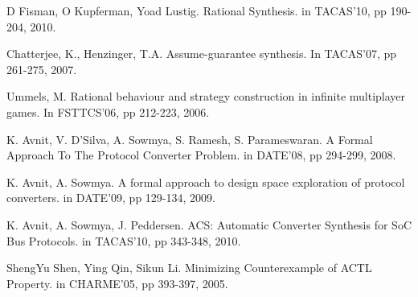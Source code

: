 \documentclass[journal]{IEEEtran}
\begin{document}
\begin{thebibliography}{1}
D Fisman, O Kupferman, Yoad Lustig.
Rational Synthesis.
in TACAS'10,
pp 190-204,
2010.

Chatterjee, K., Henzinger, T.A. Assume-guarantee synthesis.
In TACAS'07,
pp 261-275,
2007.

Ummels, M.
Rational behaviour and strategy construction in infinite multiplayer games.
In FSTTCS'06,
pp 212-223,
2006.

K. Avnit, V. D'Silva, A. Sowmya, S. Ramesh, S. Parameswaran.
A Formal Approach To The Protocol Converter Problem.
in DATE'08,
pp 294-299,
2008.



K. Avnit, A. Sowmya.
A formal approach to design space exploration of protocol converters.
in DATE'09,
pp 129-134,
2009.

K. Avnit, A. Sowmya, J. Peddersen.
ACS: Automatic Converter Synthesis for SoC Bus Protocols.
in TACAS'10,
pp 343-348,
2010.

ShengYu Shen, Ying Qin, Sikun Li.
Minimizing Counterexample of ACTL Property.
in CHARME'05,
pp 393-397,
2005.

\end{thebibliography}

%


\end{document}
